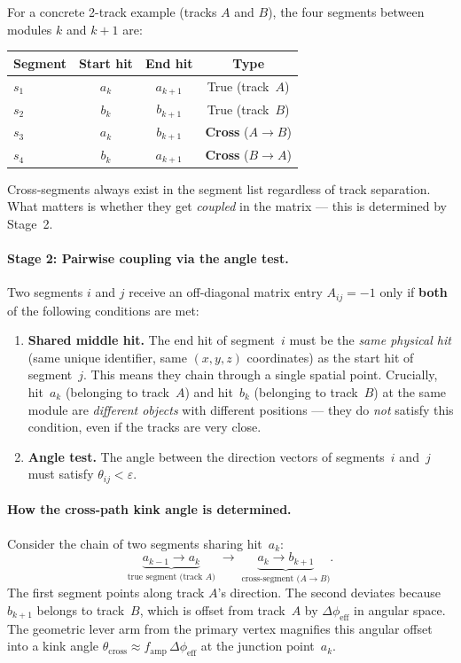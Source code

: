 \documentclass[12pt,a4paper]{article}
\newcommand{\eps}{\varepsilon}
\begin{document}
For a concrete 2-track example (tracks $A$ and $B$), the four segments
between modules $k$ and $k\!+\!1$ are:
\begin{center}
\begin{tabular}{lccc}
  \toprule
  Segment & Start hit & End hit & Type \\
  \midrule
  $s_1$ & $a_k$     & $a_{k+1}$ & True (track~$A$) \\
  $s_2$ & $b_k$     & $b_{k+1}$ & True (track~$B$) \\
  $s_3$ & $a_k$     & $b_{k+1}$ & \textbf{Cross} ($A \to B$) \\
  $s_4$ & $b_k$     & $a_{k+1}$ & \textbf{Cross} ($B \to A$) \\
  \bottomrule
\end{tabular}
\end{center}

\noindent Cross-segments always exist in the segment list regardless of
track separation.  What matters is whether they get \emph{coupled} in the
matrix --- this is determined by Stage~2.

\paragraph{Stage 2: Pairwise coupling via the angle test.}
Two segments $i$ and $j$ receive an off-diagonal matrix entry
$A_{ij} = -1$ only if \textbf{both} of the following conditions are met:
\begin{enumerate}
  \item \textbf{Shared middle hit.}  The end hit of segment~$i$ must be
    the \emph{same physical hit} (same unique identifier, same $(x,y,z)$
    coordinates) as the start hit of segment~$j$.
    This means they chain through a single spatial point.
    Crucially, hit~$a_k$ (belonging to track~$A$) and hit~$b_k$
    (belonging to track~$B$) at the same module are \emph{different
    objects} with different positions --- they do \emph{not} satisfy this
    condition, even if the tracks are very close.
  \item \textbf{Angle test.}  The angle between the direction vectors of
    segments~$i$ and~$j$ must satisfy $\theta_{ij} < \eps$.
\end{enumerate}

\paragraph{How the cross-path kink angle is determined.}
Consider the chain of two segments sharing hit~$a_k$:
\begin{equation}
  \underbrace{a_{k-1} \to a_k}_{\text{true segment (track }A\text{)}}
  \;\longrightarrow\;
  \underbrace{a_k \to b_{k+1}}_{\text{cross-segment (}A \to B\text{)}}.
  \label{eq:cross_chain}
\end{equation}
The first segment points along track $A$'s direction.  The second
deviates because $b_{k+1}$ belongs to track~$B$, which is offset from
track~$A$ by $\Delta\phi_\text{eff}$ in angular space.  The geometric
lever arm from the primary vertex magnifies this angular offset into a
kink angle $\theta_\text{cross} \approx f_\text{amp}\,\Delta\phi_\text{eff}$
at the junction point~$a_k$.
\end{document}
